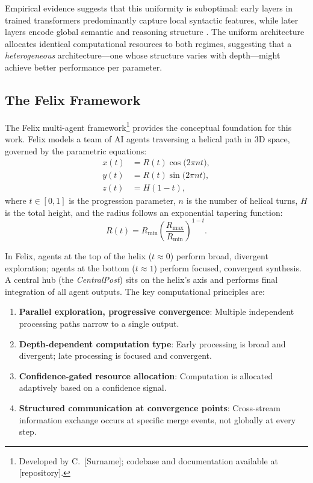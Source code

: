 \documentclass[11pt,a4paper]{article}
\theoremstyle{definition}
\theoremstyle{plain}
\theoremstyle{remark}
\begin{document}
Empirical evidence suggests that this uniformity is suboptimal: early layers 
in trained transformers predominantly capture local syntactic features, while 
later layers encode global semantic and reasoning structure 
\cite{tenney2019bert, clark2019what}. The uniform architecture allocates 
identical computational resources to both regimes, suggesting that a 
\emph{heterogeneous} architecture---one whose structure varies with 
depth---might achieve better performance per parameter.

\subsection{The Felix Framework}

The Felix multi-agent framework\footnote{Developed by C.\ [Surname]; 
codebase and documentation available at [repository].} provides the 
conceptual foundation for this work. Felix models a team of AI agents 
traversing a helical path in 3D space, governed by the parametric equations:
\begin{align}
  x(t) &= R(t)\cos\bigl(2\pi n t\bigr), \label{eq:felix-x}\\
  y(t) &= R(t)\sin\bigl(2\pi n t\bigr), \label{eq:felix-y}\\
  z(t) &= H(1 - t), \label{eq:felix-z}
\end{align}
where $t \in [0,1]$ is the progression parameter, $n$ is the number of 
helical turns, $H$ is the total height, and the radius follows an 
exponential tapering function:
\begin{equation}\label{eq:felix-radius}
  R(t) = R_{\min} \left(\frac{R_{\max}}{R_{\min}}\right)^{1-t}.
\end{equation}

In Felix, agents at the top of the helix ($t \approx 0$) perform broad, 
divergent exploration; agents at the bottom ($t \approx 1$) perform focused, 
convergent synthesis. A central hub (the \emph{CentralPost}) sits on the 
helix's axis and performs final integration of all agent outputs. The key 
computational principles are:
\begin{enumerate}[label=(\roman*)]
  \item \textbf{Parallel exploration, progressive convergence}: Multiple 
    independent processing paths narrow to a single output.
  \item \textbf{Depth-dependent computation type}: Early processing is 
    broad and divergent; late processing is focused and convergent.
  \item \textbf{Confidence-gated resource allocation}: Computation is 
    allocated adaptively based on a confidence signal.
  \item \textbf{Structured communication at convergence points}: 
    Cross-stream information exchange occurs at specific merge events, not 
    globally at every step.
\end{enumerate}
\end{document}

